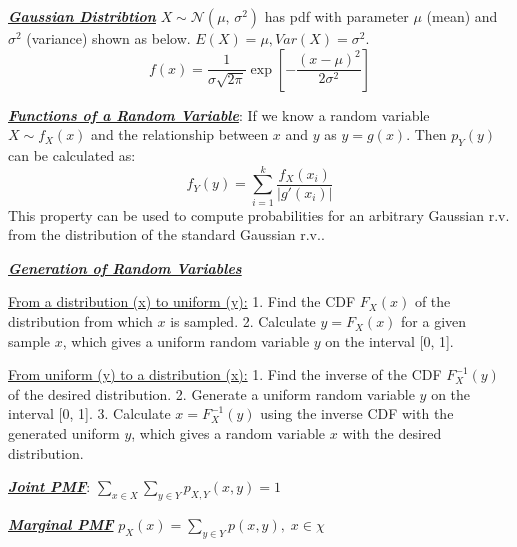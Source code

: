 \documentclass[12pt]{article}
\newcommand{\bulletPoint}[1]{\ul{\textit{\textbf{#1}}}}
\begin{document}
\begin{multicols*}{4}
\bulletPoint{Gaussian Distribtion}
$X \sim \mathcal{N}(\mu,\,\sigma^{2})$ has pdf with parameter $\mu$ (mean) and $\sigma ^2$ (variance) shown as below. $E(X)=\mu, Var(X)=\sigma^2$.
\useshortskip \begin{equation*}
    f(x)=\frac{1}{\sigma\sqrt{2\pi}}\exp{[-\frac{(x-\mu)^{2}}{2\sigma^{2}}]}
\end{equation*}


\bulletPoint{Functions of a Random Variable}:
If we know a random variable $X \sim f_X(x)$ and the relationship between $x$ and $y$ as $y = g(x)$. Then $p_Y(y)$ can be calculated as:
\useshortskip \begin{equation*}
    f_Y(y) = \sum^k_{i=1}\frac{f_X(x_i)}{| g'(x_i) |}
\end{equation*}
This property can be used to compute probabilities for an arbitrary Gaussian r.v. from the distribution of the standard Gaussian r.v..


\bulletPoint{Generation of Random Variables}

\underline{From a distribution (x) to uniform (y):} 
1. Find the CDF \( F_X(x) \) of the distribution from which \( x \) is sampled.
2. Calculate \( y = F_X(x) \) for a given sample \( x \), which gives a uniform random variable \( y \) on the interval [0, 1].

\underline{From uniform (y) to a distribution (x):} 
1. Find the inverse of the CDF \( F_X^{-1}(y) \) of the desired distribution.
2. Generate a uniform random variable \( y \) on the interval [0, 1].
3. Calculate \( x = F^{-1}_X(y) \) using the inverse CDF with the generated uniform \( y \), which gives a random variable \( x \) with the desired distribution.



\bulletPoint{Joint PMF}: $\sum_{x \in X} \sum_{y \in Y} p_{X, Y}(x,y) = 1$


\bulletPoint{Marginal PMF} $p_X(x) =\sum_{y \in Y} p(x,y), \; x \in \chi$



\end{multicols*}
\end{document}
